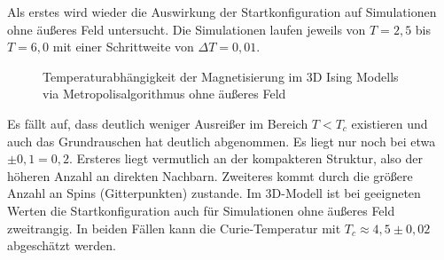 Als erstes wird wieder die Auswirkung der Startkonfiguration auf Simulationen ohne äußeres Feld untersucht. Die Simulationen laufen jeweils von $T=2,5$ bis $T=6,0$ mit einer Schrittweite von $\Delta T= 0,01$.
\begin{figure}[H]
	\centering
	\caption{Temperaturabhängigkeit der Magnetisierung im 3D Ising Modells via Metropolisalgorithmus ohne äußeres Feld}
	\label{mp3d0modes}
\end{figure}
Es fällt auf, dass deutlich weniger Ausreißer im Bereich $T<T_{c}$ existieren und auch das Grundrauschen hat deutlich abgenommen. Es liegt nur noch bei etwa $\pm 0,1 = 0,2$. Ersteres liegt vermutlich an der kompakteren Struktur, also der höheren Anzahl an direkten Nachbarn. Zweiteres kommt durch die größere Anzahl an Spins (Gitterpunkten) zustande. Im 3D-Modell ist bei geeigneten Werten die Startkonfiguration auch für Simulationen ohne äußeres Feld zweitrangig. In beiden Fällen kann die Curie-Temperatur mit $T_{c}\approx 4,5\pm 0,02$ abgeschätzt werden.


